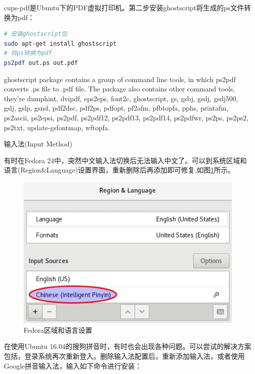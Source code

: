\documentclass[12pt]{book}
\makeatletter
\numberwithin{dummy}{section}
\theoremstyle{ocrenumbox}
\theoremstyle{blacknumex}
\theoremstyle{blacknumbox}
\theoremstyle{ocrenum}
\renewcommand{\subsection}{\@startsection {subsection}{2}{\z@}
	{-3ex \@plus -0.1ex \@minus -.4ex}
	{0.5ex \@plus.2ex }
	{\normalfont\sffamily\bfseries}}
\makeatother
\begin{document}
cups-pdf是Ubuntu下的PDF虚拟打印机。第二步安装ghostscript将生成的ps文件转换为pdf：

\begin{lstlisting}[language=Bash]
# 安装ghostscript包
sudo apt-get install ghostscript
# 将ps转换为pdf
ps2pdf out.ps out.pdf
\end{lstlisting}

ghostscript package contains a group of command line tools, in which ps2pdf converts .ps file to .pdf file. The package also contains other command tools, they’re dumphint, dvipdf, eps2eps, font2c, ghostscript, gs, gsbj, gsdj, gsdj500, gslj, gslp, gsnd, pdf2dsc, pdf2ps, pdfopt, pf2afm, pfbtopfa, pphs, printafm, ps2ascii, ps2epsi, ps2pdf, ps2pdf12, ps2pdf13, ps2pdf14, ps2pdfwr, ps2ps, ps2ps2, ps2txt, update-gsfontmap, wftopfa.

\subsection{输入法(Input Method)}

有时在Fedora 24中，突然中文输入法切换后无法输入中文了。可以到系统区域和语言(Region\&Language)设置界面，重新删除后再添加即可修复,如图\ref{fig:regionandlanguagesetting}所示。

\begin{figure}[htbp]
	\centering
	\includegraphics[scale=0.6]{regionandlanguagesetting.jpg}
	\caption{Fedora区域和语言设置}
	\label{fig:regionandlanguagesetting}
\end{figure}

在使用Ubuntu 16.04的搜狗拼音时，有时也会出现各种问题。可以尝试的解决方案包括，登录系统再次重新登入。删除输入法配置后，重新添加输入法，或者使用Google拼音输入法，输入如下命令进行安装：
\end{document}
